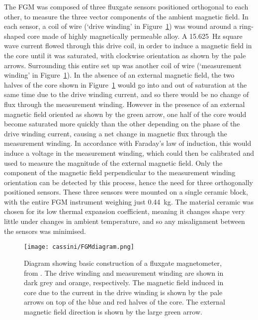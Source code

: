The FGM was composed of three fluxgate sensors positioned orthogonal to each other, to measure the three vector components of the ambient magnetic field.  In each sensor, a coil of wire (`drive winding' in Figure~\ref{cassini:fig:FGMdiagram}) was wound around a ring-shaped core made of highly magnetically permeable alloy. A \SI{15.625}{\hertz} square wave current flowed through this drive coil, in order to induce a magnetic field in the core until it was saturated, with clockwise orientation as shown by the pale arrows. Surrounding this entire set up was another coil of wire (`measurement winding' in Figure~\ref{cassini:fig:FGMdiagram}). In the absence of an external magnetic field, the two halves of the core shown in Figure~\ref{cassini:fig:FGMdiagram} would go into and out of saturation at the same time due to the drive winding current, and so there would  be no change of  flux through the measurement winding. However in the presence of an external magnetic field  oriented as shown by  the green arrow, one half of the core would become saturated more quickly than the other depending on the phase of the drive winding current, causing a net change in magnetic flux through the measurement winding. In accordance with Faraday's law of  induction, this  would induce a voltage in  the measurement winding,  which could then be calibrated and used to measure the magnitude  of the external magnetic field. Only the component of the magnetic field perpendicular to the measurement winding orientation can be detected by this process, hence the need for three orthogonally positioned sensors. These three sensors were mounted on a single ceramic block, with the entire FGM  instrument  weighing just \SI{0.44}{kg}. The material ceramic was chosen for its low thermal expansion coefficient,  meaning  it changes shape very little under  changes in ambient temperature, and so any misalignment between the sensors was minimised.

\begin{figure}
\centering
\noindent\texttt{[image: cassini/FGMdiagram.png]}
\caption[Diagram of how a fluxgate magnetometer works.]{Diagram showing basic construction of a fluxgate magnetometer, from \citet{carisma2018}. The drive winding and measurement winding are shown in dark grey and orange, respectively. The magnetic field induced in core due to the current in  the drive winding  is shown by  the pale arrows on top of  the blue and red halves of the  core. The external magnetic field direction is shown by the large green arrow.}
\label{cassini:fig:FGMdiagram}
\end{figure}

